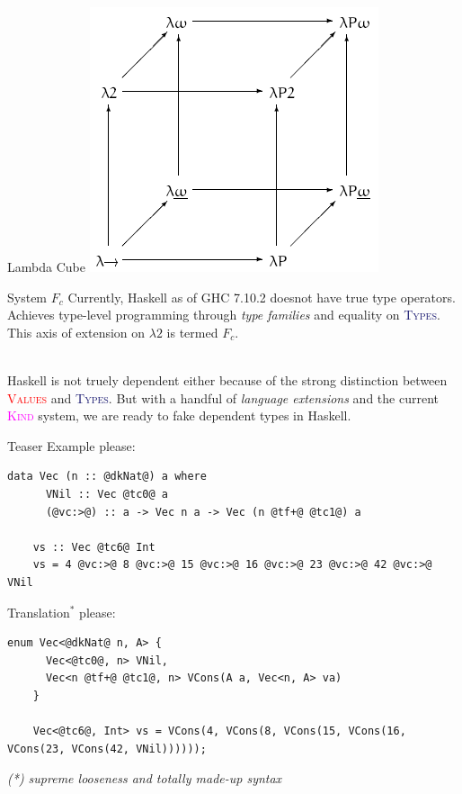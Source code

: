 \documentclass[xcolor={usenames,dvipsnames}]{beamer}
\newcommand{\htycon}[1]{\textcolor{MidnightBlue}{\textsc{#1}}}
\newcommand{\hvalcon}[1]{\textcolor{Red}{\textsc{#1}}}
\newcommand{\hkind}[1]{\textcolor{Fuchsia}{\textsc{#1}}}
\begin{document}
\begin{frame}[fragile]{Lambda Cube}
  \includegraphics[scale=0.6]{Lambda_cube.png}
\end{frame}

\begin{frame}[fragile]{System $F_c$}
  Currently, Haskell as of GHC 7.10.2 doesnot have true type operators. Achieves type-level programming through \textit{type families} and equality on \htycon{Types}. This axis of extension on $\lambda2$ is termed  $F_c$.

  \ \\
  \pause
   Haskell is not truely dependent either because of the strong distinction between \hvalcon{Values} and \htycon{Types}. But with a handful of \textit{language extensions} and the current \hkind{Kind} system, we are ready to fake dependent types in Haskell.
\end{frame}

\begin{frame}[fragile]{Teaser}
  Example please:
  \begin{lstlisting}[style=hask]
    data Vec (n :: @dkNat@) a where
      VNil :: Vec @tc0@ a
      (@vc:>@) :: a -> Vec n a -> Vec (n @tf+@ @tc1@) a

    vs :: Vec @tc6@ Int
    vs = 4 @vc:>@ 8 @vc:>@ 15 @vc:>@ 16 @vc:>@ 23 @vc:>@ 42 @vc:>@ VNil
  \end{lstlisting}

  \pause
  Translation$^*$ please:
  \begin{lstlisting}[style=hask]
    enum Vec<@dkNat@ n, A> {
      Vec<@tc0@, n> VNil,
      Vec<n @tf+@ @tc1@, n> VCons(A a, Vec<n, A> va)
    }

    Vec<@tc6@, Int> vs = VCons(4, VCons(8, VCons(15, VCons(16, VCons(23, VCons(42, VNil))))));
  \end{lstlisting}
  \textit{\tiny{(*) supreme looseness and totally made-up syntax}}
\end{frame}
\end{document}
